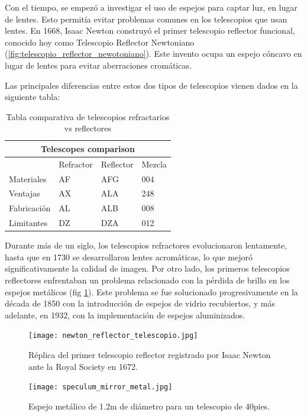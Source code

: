 Con el tiempo, se empezó a investigar el uso de espejos para captar luz, en lugar de lentes. Esto permitía evitar problemas comunes en los telescopios que usan lentes. En 1668, Isaac Newton construyó el primer telescopio reflector funcional, conocido hoy como Telescopio Reflector Newtoniano (\ref{fig:telescopio_reflector_newotoniano}). Este invento ocupa un espejo cóncavo en lugar de lentes para evitar aberraciones cromáticas. 

Las principales diferencias entre estos dos tipos de telescopios vienen dados en la siguiente tabla:
 
\begin{table}[h!]
\centering
\caption{Tabla comparativa de telescopios refractarios vs reflectores}
\begin{tabular}{ |p{3cm}||p{3cm}|p{3cm}|p{3cm}|  }
	\hline
	\multicolumn{4}{|c|}{Telescopes comparison} \\
	\hline
	 & Refractor & Reflector & Mezcla \\
	\hline
	Materiales & AF    &AFG&   004\\
	Ventajas&   AX  & ALA   &248\\
	Fabricación &AL & ALB&  008\\
	Limitantes &DZ & DZA&  012\\
	\hline
\end{tabular}
\end{table}

Durante más de un siglo, los telescopios refractores evolucionaron lentamente, hasta que en 1730 se desarrollaron lentes acromáticas, lo que mejoró significativamente la calidad de imagen. Por otro lado, los primeros telescopios reflectores enfrentaban un problema relacionado con la pérdida de brillo en los espejos metálicos (fig \ref{fig:espejo_metalico_especulum}). Este problema se fue solucionado progresivamente en la década de 1850 con la introducción de espejos de vidrio recubiertos, y más adelante, en 1932, con la implementación de espejos aluminizados.

\begin{figure}[H]
	\centering
	\texttt{[image: newton\_reflector\_telescopio.jpg]}
	\caption{Réplica del primer telescopio reflector registrado por Isaac Newton ante la Royal Society en 1672.}
	\label{fig:telescopio_reflector_newotoniano}
	\texttt{[image: speculum\_mirror\_metal.jpg]}
	\caption{Espejo metálico de 1.2m de diámetro para un telescopio de 40pies.}
	\label{fig:espejo_metalico_especulum}
\end{figure}

